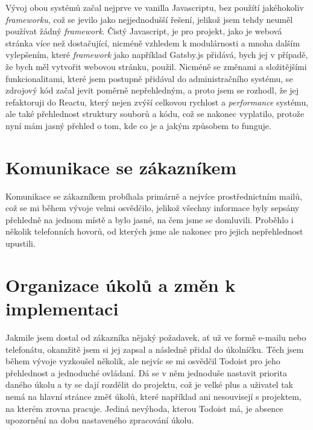 \documentclass[12pt,a4paper]{report}
\begin{document}
  Vývoj obou systémů začal nejprve ve vanilla Javascriptu, bez použítí jakéhokoliv \emph{frameworku}, což
  se jevilo jako nejjednodušší řešení, jelikož jsem tehdy neuměl používat žádný \emph{framework}. Čistý Javascript, 
  je pro projekt, jako je webová stránka více než
  dostačující, nicméně vzhledem k modulárnosti a mnoha dalším vylepšením, které \emph{framework} jako například Gatsby.js přidává,
  bych jej v případě, že bych měl vytvořit webovou stránku, použil.
  Nicméně se změnami a složitějšími funkcionalitami, které jsem postupně přidával do administračního systému, se zdrojový kód začal jevit
  poměrně nepřehledným, a proto jsem se rozhodl, že jej refaktoruji do Reactu, který nejen zvýší celkovou rychlost a \emph{performance} systému, 
  ale také přehlednost struktury souborů a kódu,
  což se nakonec vyplatilo, protože nyní mám jasný přehled o tom, kde co je a jakým způsobem to funguje.

  \section{Komunikace se zákazníkem}
  Komunikace se zákazníkem probíhala primárně a nejvíce prostřednictním mailů,
  což se mi během vývoje velmi osvědčilo, jelikož všechny informace byly sepsány přehledně
  na jednom místě a bylo jasné, na čem jsme se domluvili. Proběhlo i několik telefonních hovorů, od kterých jsme ale nakonec pro jejich
  nepřehlednost upustili.
 
  \section{Organizace úkolů a změn k implementaci}
  Jakmile jsem dostal od zákazníka nějaký požadavek, ať už ve formě e-mailu nebo telefonátu, okamžitě jsem si jej 
  zapsal a následně přidal do úkolníčku. Těch jsem během vývoje vyzkoušel několik, ale nejvíc se mi osvědčil 
  Todoist pro jeho přehlednost a jednoduché ovládaní. Dá se v něm jednoduše nastavit priorita daného úkolu a ty se dají rozdělit
  do projektu, což je velké plus a uživatel tak nemá na hlavní stránce změť úkolů, které například ani nesouvisejí s projektem, na kterém zrovna pracuje.
  Jediná nevýhoda, kterou Todoist má, je absence upozornění na dobu nastaveného zpracování úkolu. 
\end{document}
